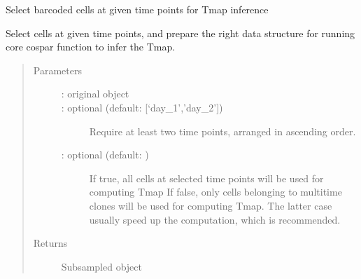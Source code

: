 \documentclass[letterpaper,10pt,english]{sphinxmanual}
\begin{document}
\begin{fulllineitems}
\label{\detokenize{cospar.tmap.select_time_points:cospar.tmap.select_time_points}}
Select barcoded cells at given time points for Tmap inference

Select cells at given time points, and prepare the right data structure
for running core cospar function to infer the Tmap.
\begin{quote}\begin{description}
\item[{Parameters}] \leavevmode\begin{description}
\item[{ : original  object}] \leavevmode


\item[{ :  optional (default: {[}‘day\_1’,’day\_2’{]})}] \leavevmode
Require at least two time points, arranged in ascending order.

\item[{ :  optional (default: )}] \leavevmode
If true, all cells at selected time points will be used for computing Tmap
If false, only cells belonging to multi\sphinxhyphen{}time clones will be used for computing Tmap.
The latter case usually speed up the computation, which is recommended.

\end{description}

\item[{Returns}] \leavevmode
Subsampled  object

\end{description}\end{quote}

\end{fulllineitems}
\end{document}
